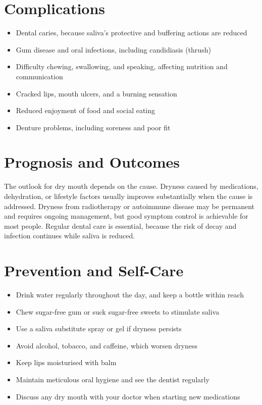 \section*{Complications}
\begin{itemize}
    \item Dental caries, because saliva's protective and buffering actions are reduced
    \item Gum disease and oral infections, including candidiasis (thrush)
    \item Difficulty chewing, swallowing, and speaking, affecting nutrition and communication
    \item Cracked lips, mouth ulcers, and a burning sensation
    \item Reduced enjoyment of food and social eating
    \item Denture problems, including soreness and poor fit
\end{itemize}

\section*{Prognosis and Outcomes}
The outlook for dry mouth depends on the cause. Dryness caused by medications, dehydration, or lifestyle factors usually improves substantially when the cause is addressed. Dryness from radiotherapy or autoimmune disease may be permanent and requires ongoing management, but good symptom control is achievable for most people. Regular dental care is essential, because the risk of decay and infection continues while saliva is reduced.

\section*{Prevention and Self-Care}
\begin{itemize}
    \item Drink water regularly throughout the day, and keep a bottle within reach
    \item Chew sugar-free gum or suck sugar-free sweets to stimulate saliva
    \item Use a saliva substitute spray or gel if dryness persists
    \item Avoid alcohol, tobacco, and caffeine, which worsen dryness
    \item Keep lips moisturised with balm
    \item Maintain meticulous oral hygiene and see the dentist regularly
    \item Discuss any dry mouth with your doctor when starting new medications
\end{itemize}

